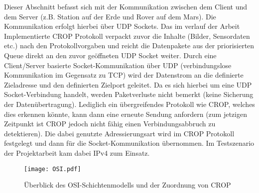Dieser Abschnitt befasst sich mit der Kommunikation zwischen dem Client
und dem Server (z.B. Station auf der Erde und Rover auf dem Mars). Die
Kommunikation erfolgt hierbei {\"u}ber UDP Sockets. Das im verlauf der Arbeit
Implementierte CROP Protokoll verpackt zuvor die Inhalte (Bilder, Sensordaten etc.) 
nach den Protokollvorgaben und reicht die Datenpakete aus der priorisierten Queue 
direkt an den zuvor ge{\"o}ffneten UDP Socket weiter. Durch eine Client/Server
basierte Socket-Kommunikation {\"u}ber UDP 
(verbindungslose Kommunikation im Gegensatz zu TCP) wird der Datenstrom an die
definierte Zieladresse und den definierten Zielport geleitet. Da es sich
hierbei um eine UDP Socket-Verbindung handelt, werden Paketverluste nicht
bemerkt (keine Sicherung der Daten{\"u}bertragung). Lediglich ein {\"u}bergreifendes
Protokoll wie CROP, welches dies erkennen k{\"o}nnte, kann dann eine erneute
Sendung anfordern (zum jetzigen Zeitpunkt ist CROP jedoch nicht f{\"a}hig einen
Verbindungsabbruch zu detektieren). Die dabei genutzte Adressierungsart wird im
CROP Protokoll festgelegt und dann f{\"u}r die Socket-Kommunikation {\"u}bernommen. Im
Testszenario der Projektarbeit kam dabei IPv4 zum Einsatz.

\begin{figure}[H]
\centering
\texttt{[image: OSI.pdf]}
\caption{{\"U}berblick des OSI-Schichtenmodells und der Zuordnung von CROP}
\label{fig:OSI}
\end{figure}